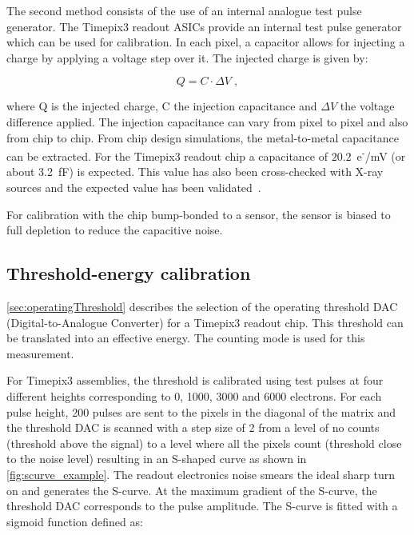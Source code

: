 The second method consists of the use of an internal analogue test
pulse generator. The Timepix3 readout ASICs provide an internal test
pulse generator which can be used for calibration. In each pixel, a
capacitor allows for injecting a charge by applying a voltage step
over it. The injected charge is given by:

\begin{equation}
  Q = C \cdot \Delta V \; ,
  \label{eq:testpulseCharge}
\end{equation}

where Q is the injected charge, C the injection capacitance and
$\Delta V$ the voltage difference applied. The injection capacitance
can vary from pixel to pixel and also from chip to chip. From chip
design simulations, the metal-to-metal capacitance can be
extracted. For the Timepix3 readout chip a capacitance of
$20.2$~e\textsuperscript{-}/mV (or about 3.2~fF) is expected. This
value has also been cross-checked with X-ray sources and the expected
value has been validated~\cite{MedipixCapa}.

For calibration with the chip bump-bonded to a sensor, the sensor is
biased to full depletion to reduce the capacitive noise.



\subsection{Threshold-energy calibration} 
\label{sec:thresholdCalibration}

\cref{sec:operatingThreshold} describes the selection of the operating
threshold DAC (Digital-to-Analogue Converter) for a Timepix3 readout
chip. This threshold can be translated into an effective energy. The
counting mode is used for this measurement.

For Timepix3 assemblies, the threshold is calibrated using test pulses
at four different heights corresponding to 0, 1000, 3000 and 6000
electrons. For each pulse height, 200 pulses are sent to the pixels in
the diagonal of the matrix and the threshold DAC is scanned with a
step size of 2 from a level of no counts (threshold above the signal)
to a level where all the pixels count (threshold close to the noise
level) resulting in an S-shaped curve as shown in
\cref{fig:scurve_example}. The readout electronics noise smears the
ideal sharp turn on and generates the S-curve. At the maximum gradient
of the S-curve, the threshold DAC corresponds to the pulse
amplitude. The S-curve is fitted with a sigmoid function defined as:

